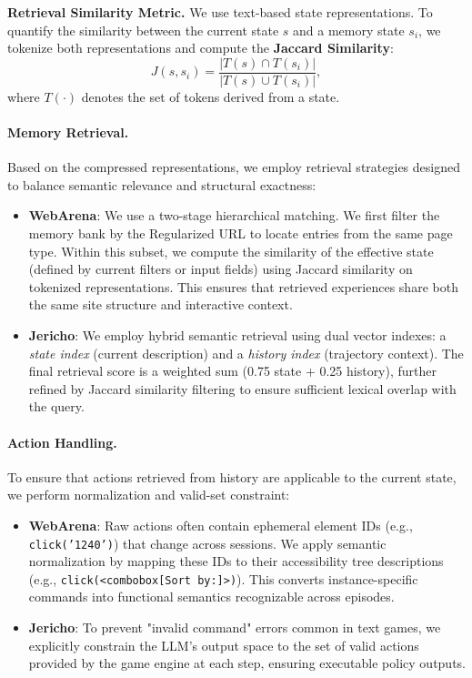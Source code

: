 \textbf{Retrieval Similarity Metric.} %
We use text-based state representations. To quantify the similarity between the current state $s$ and a memory state $s_i$, we tokenize both representations and compute the \textbf{Jaccard Similarity}:
\begin{equation}
    J(s, s_i) = \frac{|T(s) \cap T(s_i)|}{|T(s) \cup T(s_i)|},
\end{equation}
where $T(\cdot)$ denotes the set of tokens derived from a state. 

\paragraph{Memory Retrieval.}
Based on the compressed representations, we employ retrieval strategies designed to balance semantic relevance and structural exactness:

\begin{itemize}[leftmargin=*,nosep]
    \item \textbf{WebArena}: 
    We use a two-stage hierarchical matching. We first filter the memory bank by the Regularized URL to locate entries from the same page type. Within this subset, we compute the similarity of the effective state (defined by current filters or input fields) using Jaccard similarity on tokenized representations. This ensures that retrieved experiences share both the same site structure and interactive context.

    \item \textbf{Jericho}: 
    We employ hybrid semantic retrieval using dual vector indexes: a \textit{state index} (current description) and a \textit{history index} (trajectory context). The final retrieval score is a weighted sum (0.75 state + 0.25 history), further refined by Jaccard similarity filtering to ensure sufficient lexical overlap with the query.
\end{itemize}

\paragraph{Action Handling.}
To ensure that actions retrieved from history are applicable to the current state, we perform normalization and valid-set constraint:

\begin{itemize}[leftmargin=*,nosep]
    \item \textbf{WebArena}: 
    Raw actions often contain ephemeral element IDs (e.g., \texttt{click('1240')}) that change across sessions. We apply semantic normalization by mapping these IDs to their accessibility tree descriptions (e.g., \texttt{click(<combobox[Sort by:]>)}). This converts instance-specific commands into functional semantics recognizable across episodes.

    \item \textbf{Jericho}: 
    To prevent "invalid command" errors common in text games, we explicitly constrain the LLM's output space to the set of valid actions provided by the game engine at each step, ensuring executable policy outputs.
\end{itemize}



